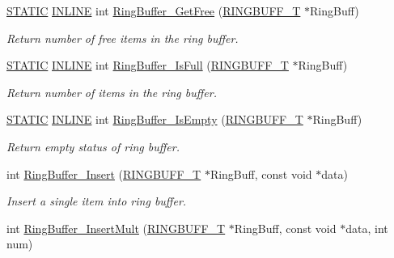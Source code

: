 \begin{DoxyCompactItemize}
\hyperlink{group___l_p_c___types___public___macros_ga10b2d890d871e1489bb02b7e70d9bdfb}{S\+T\+A\+T\+IC} \hyperlink{spifi__18xx__43xx_8h_a2eb6f9e0395b47b8d5e3eeae4fe0c116}{I\+N\+L\+I\+NE} int \hyperlink{group___ring___buffer_ga75424687def8979742338366d39c8559}{Ring\+Buffer\+\_\+\+Get\+Free} (\hyperlink{struct_r_i_n_g_b_u_f_f___t}{R\+I\+N\+G\+B\+U\+F\+F\+\_\+T} $\ast$Ring\+Buff)
\begin{DoxyCompactList}\small\item\em Return number of free items in the ring buffer. \end{DoxyCompactList}\item 
\hyperlink{group___l_p_c___types___public___macros_ga10b2d890d871e1489bb02b7e70d9bdfb}{S\+T\+A\+T\+IC} \hyperlink{spifi__18xx__43xx_8h_a2eb6f9e0395b47b8d5e3eeae4fe0c116}{I\+N\+L\+I\+NE} int \hyperlink{group___ring___buffer_ga760da012435262add1d8d7aa79e873a0}{Ring\+Buffer\+\_\+\+Is\+Full} (\hyperlink{struct_r_i_n_g_b_u_f_f___t}{R\+I\+N\+G\+B\+U\+F\+F\+\_\+T} $\ast$Ring\+Buff)
\begin{DoxyCompactList}\small\item\em Return number of items in the ring buffer. \end{DoxyCompactList}\item 
\hyperlink{group___l_p_c___types___public___macros_ga10b2d890d871e1489bb02b7e70d9bdfb}{S\+T\+A\+T\+IC} \hyperlink{spifi__18xx__43xx_8h_a2eb6f9e0395b47b8d5e3eeae4fe0c116}{I\+N\+L\+I\+NE} int \hyperlink{group___ring___buffer_ga6f03e04a69262864bde4f35fc6f3dfb5}{Ring\+Buffer\+\_\+\+Is\+Empty} (\hyperlink{struct_r_i_n_g_b_u_f_f___t}{R\+I\+N\+G\+B\+U\+F\+F\+\_\+T} $\ast$Ring\+Buff)
\begin{DoxyCompactList}\small\item\em Return empty status of ring buffer. \end{DoxyCompactList}\item 
int \hyperlink{group___ring___buffer_gaafdee54f2525b2c7a983d1a631b42226}{Ring\+Buffer\+\_\+\+Insert} (\hyperlink{struct_r_i_n_g_b_u_f_f___t}{R\+I\+N\+G\+B\+U\+F\+F\+\_\+T} $\ast$Ring\+Buff, const void $\ast$data)
\begin{DoxyCompactList}\small\item\em Insert a single item into ring buffer. \end{DoxyCompactList}\item 
int \hyperlink{group___ring___buffer_gafeafb521d4e03052ab2c893fd0e388d5}{Ring\+Buffer\+\_\+\+Insert\+Mult} (\hyperlink{struct_r_i_n_g_b_u_f_f___t}{R\+I\+N\+G\+B\+U\+F\+F\+\_\+T} $\ast$Ring\+Buff, const void $\ast$data, int num)

\end{DoxyCompactItemize}
